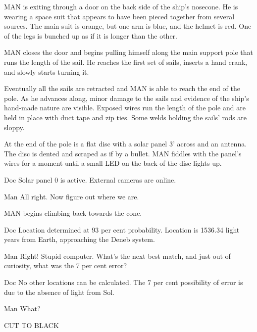 \documentclass{screenplay}[2010/1/7]
\begin{document}
MAN is exiting through a door on the back side of the ship's nosecone.  He is wearing a space suit that appears to have been pieced together from several sources.  The main suit is orange, but one arm is blue, and the helmet is red.  One of the legs is bunched up as if it is longer than the other.

MAN closes the door and begins pulling himself along the main support pole that runs the length of the sail.  He reaches the first set of sails, inserts a hand crank, and slowly starts turning it.

Eventually all the sails are retracted and MAN is able to reach the end of the pole.  As he advances along, minor damage to the sails and evidence of the ship's hand-made nature are visible.  Exposed wires run the length of the pole and are held in place with duct tape and zip ties.  Some welds holding the sails' rods are sloppy.

At the end of the pole is a flat disc with a solar panel 3' across and an antenna.  The disc is dented and scraped as if by a bullet.  MAN fiddles with the panel's wires for a moment until a small LED on the back of the disc lights up.
\begin{dialogue}{Doc}
Solar panel 0 is active.  External cameras are online.
\end{dialogue}
\begin{dialogue}{Man}
All right.  Now figure out where we are.
\end{dialogue}
MAN begins climbing back towards the cone.
\begin{dialogue}{Doc}
Location determined at 93 per cent probability.  Location is 1536.34 light years from Earth, approaching the Deneb system.
\end{dialogue}
\begin{dialogue}{Man}
Right!  Stupid computer.  What's the next best match, and just out of curiosity, what was the 7 per cent error?
\end{dialogue}
\begin{dialogue}{Doc}
No other locations can be calculated.  The 7 per cent possibility of error is due to the absence of light from Sol.
\end{dialogue}
\begin{dialogue}{Man}
What?
\end{dialogue}
CUT TO BLACK
\end{document}

